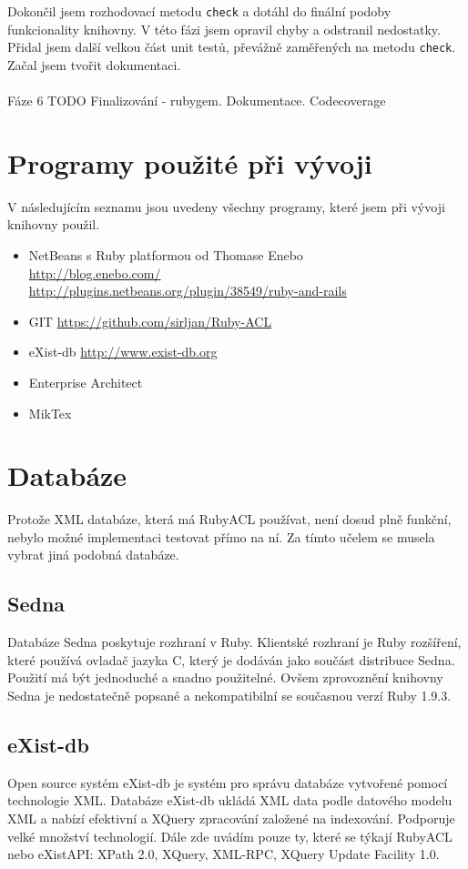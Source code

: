 \noindent Dokončil jsem rozhodovací metodu \verb|check| a dotáhl do finální podoby funkcionality knihovny. V této fázi jsem opravil chyby a odstranil nedostatky. Přidal jsem další velkou část unit testů, převážně zaměřených na metodu \verb|check|. Začal jsem tvořit dokumentaci.
\\
\\
\noindent Fáze 6
TODO
\noindent Finalizování - rubygem. Dokumentace. Codecoverage


\section{Programy použité při vývoji}
V následujícím seznamu jsou uvedeny všechny programy, které jsem při vývoji knihovny použil.
\begin{itemize}
\item NetBeans s Ruby platformou od Thomase Enebo
\\
\url{http://blog.enebo.com/}
\\
\url{http://plugins.netbeans.org/plugin/38549/ruby-and-rails}
\item GIT
\url{https://github.com/sirljan/Ruby-ACL}
\item eXist-db
\url{http://www.exist-db.org}
\item Enterprise Architect
\item MikTex
\end{itemize}
\section{Databáze}
Protože XML databáze, která má RubyACL používat, není dosud plně funkční, nebylo možné implementaci testovat přímo na ní. Za tímto učelem se musela vybrat jiná podobná databáze.

\subsection{Sedna}
Databáze Sedna poskytuje rozhraní v Ruby. Klientské rozhraní je Ruby rozšíření, které používá ovladač jazyka C, který je dodáván jako součást distribuce Sedna. Použití má být jednoduché a snadno použitelné. Ovšem zprovoznění knihovny Sedna je nedostatečně popsané a nekompatibilní se současnou verzí Ruby 1.9.3.

\subsection{eXist-db}
Open source systém eXist-db je systém pro správu databáze vytvořené pomocí technologie XML. Databáze eXist-db ukládá XML data podle datového modelu XML a nabízí efektivní a XQuery zpracování založené na indexování. Podporuje velké množství technologií. Dále zde uvádím pouze ty, které se týkají RubyACL nebo eXistAPI: XPath 2.0, XQuery, XML-RPC, XQuery Update Facility 1.0. 

